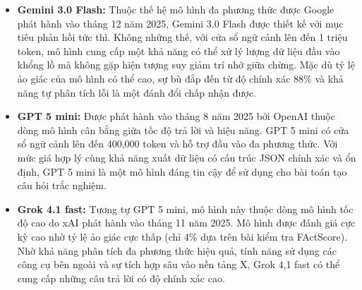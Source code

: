 \begin{itemize}
    \item \textbf{Gemini 3.0 Flash:} Thuộc thế hệ mô hình đa phương thức được Google phát hành vào tháng 12 năm 2025, Gemini 3.0 Flash được thiết kế với mục tiêu phản hồi tức thì. Không những thế, với cửa sổ ngữ cảnh lên đến 1 triệu token, mô hình cung cấp một khả năng có thể xử lý lượng dữ liệu đầu vào khổng lồ mà không gặp hiện tượng suy giảm trí nhớ giữa chừng. Mặc dù tỷ lệ ảo giác của mô hình có thể cao, sự bù đắp đến từ độ chính xác 88\% và khả năng tự phân tích lỗi là một đánh đổi chấp nhận được.
    \item \textbf{GPT 5 mini:} Được phát hành vào tháng 8 năm 2025 bởi OpenAI thuộc dòng mô hình cân bằng giữa tốc độ trả lời và hiệu năng. GPT 5 mini có cửa sổ ngữ cảnh lên đến 400,000 token và hỗ trợ đầu vào đa phương thức. Với mức giá hợp lý cùng khả năng xuất dữ liệu có cấu trúc JSON chính xác và ổn định, GPT 5 mini là một mô hình đáng tin cậy để sử dụng cho bài toán tạo câu hỏi trắc nghiệm.
    \item \textbf{Grok 4.1 fast:} Tương tự GPT 5 mini, mô hình này thuộc dòng mô hình tốc độ cao do xAI phát hành vào tháng 11 năm 2025. Mô hình được đánh giá cực kỳ cao nhờ tỷ lệ ảo giác cực thấp (chỉ 4\% dựa trên bài kiểm tra FActScore). Nhờ khả năng phân tích đa phương thức hiệu quả, tính năng sử dụng các công cụ bên ngoài và sự tích hợp sâu vào nền tảng X, Grok 4,1 fast có thể cung cấp những câu trả lời có độ chính xác cao.
\end{itemize}

\begin{table}[htbp]
    \centering
    \caption{Thông số kỹ thuật các mô hình ngôn ngữ lớn}
    \label{tab:llm_comparison_fit}
    \renewcommand{\arraystretch}{1.5}
\end{table}

